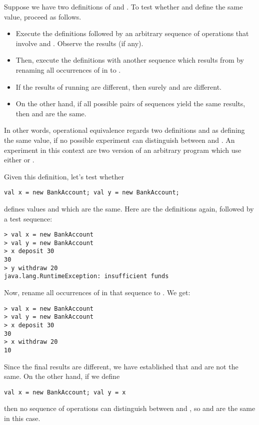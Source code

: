 {Suppose we have two definitions of  and .
To test whether  and  define the same value, proceed
as follows.
\begin{itemize}
\item
Execute the definitions followed by an
arbitrary sequence  of operations that involve  and
. Observe the results (if any).
\item
Then, execute the definitions with another sequence  which
results from  by renaming all occurrences of  in
 to .
\item
If the results of running  are different, then surely
 and  are different.
\item
On the other hand, if all possible pairs of sequences 
yield the same results, then  and  are the same.
\end{itemize}
In other words, operational equivalence regards two definitions
 and  as defining the same value, if no possible
experiment can distinguish between  and . An
experiment in this context are two version of an arbitrary program which use either
 or .
 
Given this definition, let's test whether
\begin{lstlisting}
val x = new BankAccount; val y = new BankAccount;
\end{lstlisting}
defines values  and  which are the same.
Here are the definitions again, followed by a test sequence:

\begin{lstlisting}
> val x = new BankAccount
> val y = new BankAccount
> x deposit 30
30
> y withdraw 20
java.lang.RuntimeException: insufficient funds
\end{lstlisting}

Now, rename all occurrences of  in that sequence to
. We get:
\begin{lstlisting}
> val x = new BankAccount
> val y = new BankAccount
> x deposit 30
30
> x withdraw 20
10
\end{lstlisting}
Since the final results are different, we have established that
 and  are not the same.
On the other hand, if we define
\begin{lstlisting}
val x = new BankAccount; val y = x
\end{lstlisting}
then no sequence of operations can distinguish between  and
, so  and  are the same in this case.

}
